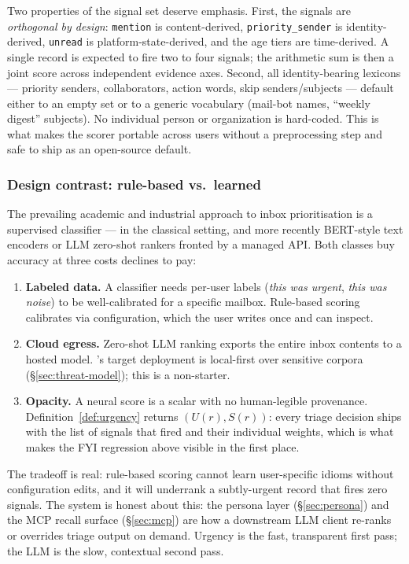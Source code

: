 Two properties of the signal set deserve emphasis. First, the signals
are \emph{orthogonal by design}: \texttt{mention} is content-derived,
\texttt{priority\_sender} is identity-derived, \texttt{unread} is
platform-state-derived, and the age tiers are time-derived. A single
record is expected to fire two to four signals; the arithmetic sum is
then a joint score across independent evidence axes. Second, all
identity-bearing lexicons --- priority senders, collaborators, action
words, skip senders/subjects --- default either to an empty set or to a
generic vocabulary (mail-bot names, ``weekly digest'' subjects). No
individual person or organization is hard-coded. This is what makes the
scorer portable across users without a preprocessing step and safe to
ship as an open-source default.

\subsubsection{Design contrast: rule-based vs.\ learned}

The prevailing academic and industrial approach to inbox
prioritisation is a supervised classifier ---
\cite{TODO-horvitz-priorities} in the classical setting, and more
recently BERT-style text encoders or LLM zero-shot rankers fronted by a
managed API. Both classes buy accuracy at three costs \coviber{}
declines to pay:

\begin{enumerate}
\item \textbf{Labeled data.} A classifier needs per-user labels
  (\emph{this was urgent}, \emph{this was noise}) to be well-calibrated
  for a specific mailbox. Rule-based scoring calibrates via
  configuration, which the user writes once and can inspect.
\item \textbf{Cloud egress.} Zero-shot LLM ranking exports the entire
  inbox contents to a hosted model. \coviber{}'s target deployment is
  local-first over sensitive corpora (\S\ref{sec:threat-model}); this
  is a non-starter.
\item \textbf{Opacity.} A neural score is a scalar with no
  human-legible provenance. Definition~\ref{def:urgency} returns
  $(U(r), S(r))$: every triage decision ships with the list of signals
  that fired and their individual weights, which is what makes the FYI
  regression above visible in the first place.
\end{enumerate}

The tradeoff is real: rule-based scoring cannot learn user-specific
idioms without configuration edits, and it will underrank a
subtly-urgent record that fires zero signals. The system is honest
about this: the persona layer (\S\ref{sec:persona}) and the MCP recall
surface (\S\ref{sec:mcp}) are how a downstream LLM client re-ranks or
overrides triage output on demand. Urgency is the fast, transparent
first pass; the LLM is the slow, contextual second pass.

